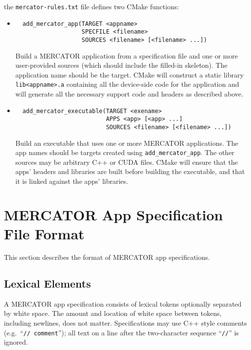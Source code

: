 \documentclass[11pt]{article}
\begin{document}
the \texttt{mercator-rules.txt} file defines two CMake functions:
\begin{itemize}

\item
\begin{verbatim}
  add_mercator_app(TARGET <appname>
                   SPECFILE <filename>
                   SOURCES <filename> [<filename> ...])
\end{verbatim}

Build a MERCATOR application from a specification file and one or more
user-provided sources (which should include the filled-in skeleton).
The application name should be the target.  CMake will construct a
static library \texttt{lib<appname>.a} containing all the device-side
code for the application and will generate all the necessary support
code and headers as described above.

\item
\begin{verbatim}
  add_mercator_executable(TARGET <exename>
                          APPS <app> [<app> ...]
                          SOURCES <filename> [<filename> ...])
\end{verbatim}

Build an executable that uses one or more MERCATOR applications.
The app names should be targets created using \texttt{add_mercator_app}.
The other sources may be arbitrary C++ or CUDA files.  CMake will
ensure that the apps' headers and libraries are built before building
the executable, and that it is linked against the apps' libraries.

\end{itemize}

\newpage

\section{MERCATOR App Specification File Format}

This section describes the format of MERCATOR app specifications.

\subsection{Lexical Elements}

A MERCATOR app specification consists of lexical tokens optionally
separated by white space. The amount and location of white space between
tokens, including newlines, does not matter.  Specifications may use
C++ style comments (e.g.\ ``\texttt{// comment}''); all text on a line
after the two-character sequence ``\texttt{//}'' is ignored.
\end{document}
